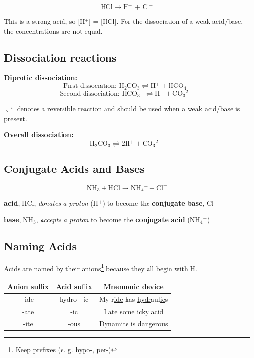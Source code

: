 \documentclass[a4paper, 12pt]{article}
\begin{document}
$$ \text{HCl} \longrightarrow \text{H$^+$ + Cl$^-$}$$

This is a strong acid, so [H$^+$] = [HCl]. For the dissociation of a weak acid/base, the concentrations are not equal.

\subsection{Dissociation reactions}

\textbf{Diprotic dissociation:}
$$\text{First dissociation: H$_2$CO$_3$}\rightleftharpoons \text{H$^+$} + \text{HCO$_4$$^-$}$$
$$\text{Second dissociation: HCO$_3$$^-$} \rightleftharpoons \text{H$^+$} + \text{CO$_3$$^{2-}$}$$

$\rightleftharpoons$ denotes a reversible reaction and should be used when a weak acid/base is present.

\textbf{Overall dissociation:}
$$\text{H$_2$CO$_3$}\rightleftharpoons \text{2H$^+$} + \text{CO$_3$$^{2-}$}$$

\subsection{Conjugate Acids and Bases}

$$\text{NH}_3 + \text{HCl} \longrightarrow \text{NH$_4$$^+$} + \text{Cl}^-$$

\textbf{acid}, HCl, \textit{donates a proton} (H$^+$) to become the \textbf{conjugate base}, Cl$^-$

\textbf{base}, NH$_3$, \textit{accepts a proton} to become the \textbf{conjugate acid} (NH$_4$$^+$)

\subsection{Naming Acids}
Acids are named by their anions\footnote{Keep prefixes (e. g. hypo-, per-)} because they all begin with H.

\begin{table}[H]
    \centering
    \begin{tabular}{c|c|c}
        \textbf{Anion suffix} & \textbf{Acid suffix} & \textbf{Mnemonic device} \\\hline
        -ide & hydro- -ic & My r\underline{ide} has \underline{hydr}aul\underline{ic}s\\
        -ate & -ic & I \underline{ate} some \underline{ic}ky acid \\
        -ite & -ous & Dynam\underline{ite} is danger\underline{ous}\\ 
    \end{tabular}
    \label{tab:namingacids}
\end{table}
\end{document}
